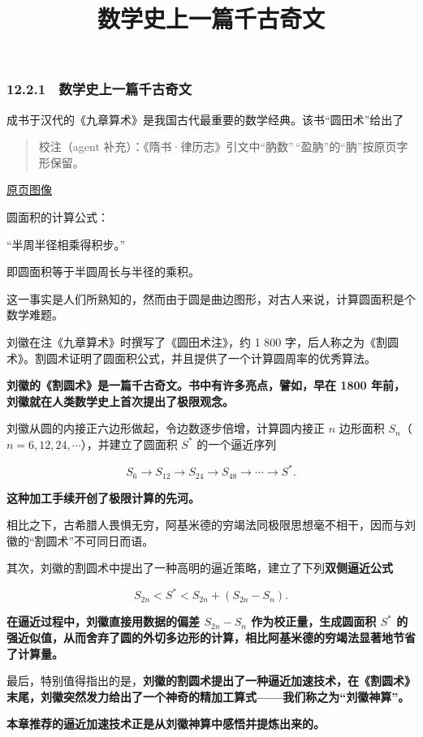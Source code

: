 \documentclass[
  10pt,
  fontset=fandol]{ctexart}
\title{数学史上一篇千古奇文}
\author{}
\date{}
\begin{document}
\maketitle

\subsubsection{12.2.1　数学史上一篇千古奇文}\label{ux6570ux5b66ux53f2ux4e0aux4e00ux7bc7ux5343ux53e4ux5947ux6587}

成书于汉代的《九章算术》是我国古代最重要的数学经典。该书``圆田术''给出了

\begin{quote}
校注（agent 补充）：《隋书·律历志》引文中``肭数''\,``盈肭''的``肭''按原页字形保留。
\end{quote}

\href{../../source-images/pdf-296.jpeg}{原页图像}

圆面积的计算公式：

``半周半径相乘得积步。''

即圆面积等于半圆周长与半径的乘积。

这一事实是人们所熟知的，然而由于圆是曲边图形，对古人来说，计算圆面积是个数学难题。

刘徽在注《九章算术》时撰写了《圆田术注》，约 1 800 字，后人称之为《割圆术》。割圆术证明了圆面积公式，并且提供了一个计算圆周率的优秀算法。

\textbf{刘徽的《割圆术》是一篇千古奇文。书中有许多亮点，譬如，早在 1800 年前，刘徽就在人类数学史上首次提出了极限观念。}

刘徽从圆的内接正六边形做起，令边数逐步倍增，计算圆内接正 \(n\) 边形面积 \(S_n\)（\(n=6,12,24,\cdots\)），并建立了圆面积 \(S^*\) 的一个逼近序列

\[
S_6\to S_{12}\to S_{24}\to S_{48}\to\cdots\to S^*.
\]

\textbf{这种加工手续开创了极限计算的先河。}

相比之下，古希腊人畏惧无穷，阿基米德的穷竭法同极限思想毫不相干，因而与刘徽的``割圆术''不可同日而语。

其次，刘徽的割圆术中提出了一种高明的逼近策略，建立了下列\textbf{双侧逼近公式}

\[
S_{2n}<S^*<S_{2n}+(S_{2n}-S_n).
\]

\textbf{在逼近过程中，刘徽直接用数据的偏差 \(S_{2n}-S_n\) 作为校正量，生成圆面积 \(S^*\) 的强近似值，从而舍弃了圆的外切多边形的计算，相比阿基米德的穷竭法显著地节省了计算量。}

最后，特别值得指出的是，\textbf{刘徽的割圆术提出了一种逼近加速技术，在《割圆术》末尾，刘徽突然发力给出了一个神奇的精加工算式------我们称之为``刘徽神算''。}

\textbf{本章推荐的逼近加速技术正是从刘徽神算中感悟并提炼出来的。}
\end{document}
